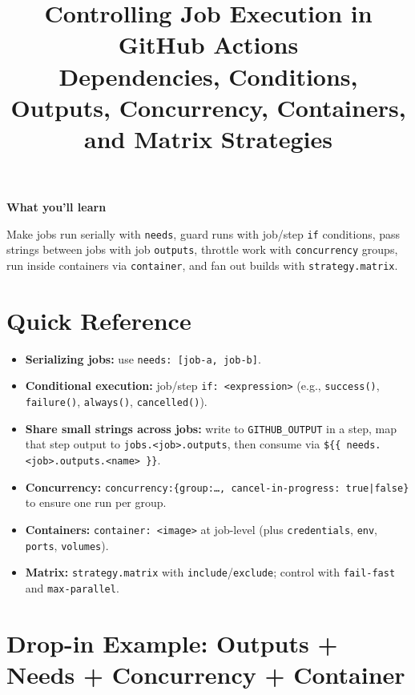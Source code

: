 \documentclass[11pt]{article}
\title{\textbf{Controlling Job Execution in GitHub Actions}\\
\large Dependencies, Conditions, Outputs, Concurrency, Containers, and Matrix Strategies}
\author{}
\date{}
\newenvironment{callout}[1]{%
  \def\FrameCommand{\fcolorbox{calloutframe}{calloutback}}%
  \MakeFramed{\advance\hsize-\width \FrameRestore}%
  \noindent\textbf{#1}\par\medskip
}{%
  \endMakeFramed
}
\begin{document}
\maketitle

\begin{callout}{What you'll learn}
Make jobs run serially with \texttt{needs}, guard runs with job/step \texttt{if} conditions, pass strings between jobs with job \texttt{outputs}, throttle work with \texttt{concurrency} groups, run inside containers via \texttt{container}, and fan out builds with \texttt{strategy.matrix}.
\end{callout}

\section*{Quick Reference}
\begin{itemize}
  \item \textbf{Serializing jobs:} use \texttt{needs: [job-a, job-b]}.
  \item \textbf{Conditional execution:} job/step \texttt{if: <expression>} (e.g., \texttt{success()}, \texttt{failure()}, \texttt{always()}, \texttt{cancelled()}).
  \item \textbf{Share small strings across jobs:} write to \texttt{GITHUB\_OUTPUT} in a step, map that step output to \texttt{jobs.<job>.outputs}, then consume via \texttt{\$\{\{ needs.<job>.outputs.<name> \}\}}.
  \item \textbf{Concurrency:} \texttt{concurrency:\{group:\ldots, cancel-in-progress: true|false\}} to ensure one run per group.
  \item \textbf{Containers:} \texttt{container: <image>} at job-level (plus \texttt{credentials}, \texttt{env}, \texttt{ports}, \texttt{volumes}).
  \item \textbf{Matrix:} \texttt{strategy.matrix} with \texttt{include}/\texttt{exclude}; control with \texttt{fail-fast} and \texttt{max-parallel}.
\end{itemize}

\section{Drop-in Example: Outputs + Needs + Concurrency + Container}
\end{document}
